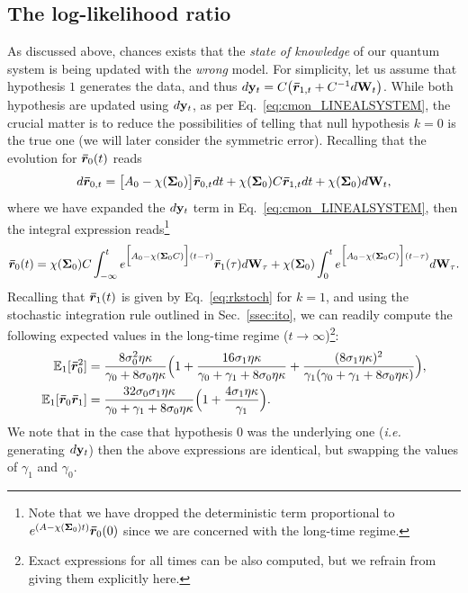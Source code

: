 \subsection{The log-likelihood ratio}
As discussed above, chances exists that the \textit{state of knowledge} of our quantum system is being updated with the \textit{wrong} model. For simplicity, let us assume that hypothesis $1$ generates the data, and thus $d\mathbf{y}_t = C\big(\bm{\bar{r}}_{1,t} + C^{-1} d\mathbf{W}_t\big)$. While both hypothesis are updated using $d\mathbf{y}_t$, as per Eq.~\ref{eq:cmon_LINEALSYSTEM}, the crucial matter is to reduce the possibilities of telling that null hypothesis $k=0$ is the true one (we will later consider the symmetric error). Recalling that the evolution for $\bm{\bar{r}}_{0}(t)$ reads
\begin{align}
d\bm{\bar{r}}_{0,t} = \big[A_0 - \chi(\bm{\Sigma}_0)\big]\bm{\bar{r}}_{0,t} dt + \chi(\bm{\Sigma}_0) C \bm{\bar{r}}_{1,t} dt + \chi(\bm{\Sigma}_0) d\mathbf{W}_t,
\end{align}
where we have expanded the $d\mathbf{y}_t$ term in Eq.~\ref{eq:cmon_LINEALSYSTEM}, then the integral expression reads\footnote{Note that we have dropped the deterministic term proportional to $e^{(A-\chi(\bm{\Sigma}_0)t)}\bm{\bar{r}}_0(0)$ since we are concerned with the long-time regime.}
\begin{align}\label{eq:expec_state_true}
\bm{\bar{r}}_{0}(t) = \chi(\bm{\Sigma}_0)C\int_{-\infty}^t e^{\Big[A_0 - \chi(\bm{\Sigma}_0 C)\Big](t-\tau)} \bm{\bar{r}}_1(\tau) d\textbf{W}_\tau +
\chi(\bm{\Sigma}_0)\int_{0}^t e^{\Big[A_0 - \chi(\bm{\Sigma}_0 C)\Big](t-\tau)} d\mathbf{W}_\tau.
\end{align}
Recalling that $\bm{\bar{r}}_1(t)$ is given by Eq.~\ref{eq:rkstoch} for $k=1$, and using the stochastic integration rule outlined in Sec.~\ref{ssec:ito}, we can readily compute the following expected values in the long-time regime ($t\to\infty$)\footnote{Exact expressions for all times can be also computed, but we refrain from giving them explicitly here.}:
\begin{align}\label{eq:expect_states_alt}
\mathbb{E}_1[\bm{\bar{r}}^2_{0}] &= \frac{8 \sigma_0^2 \eta \kappa}{\gamma_0 + 8 \sigma_0 \eta \kappa}\Big(1 + \frac{16 \sigma_1 \eta \kappa}{\gamma_0 + \gamma_1 + 8 \sigma_0 \eta \kappa} + \frac{(8 \sigma_1 \eta \kappa)^2}{\gamma_1(\gamma_0 + \gamma_1 + 8\sigma_0 \eta \kappa)}\Big), \\
\mathbb{E}_1[\bm{\bar{r}}_0\bm{\bar{r}}_1]&= \frac{32 \sigma_0 \sigma_1 \eta \kappa }{\gamma_0 + \gamma_1 + 8\sigma_0 \eta \kappa}\Big(1+\frac{4\sigma_1\eta \kappa}{\gamma_1}\Big).
\end{align}
We note that in the case that hypothesis $0$ was the underlying one (\textit{i.e.} generating $d\mathbf{y}_t$) then the above expressions are identical, but swapping the values of $\gamma_1$ and $\gamma_0$.

